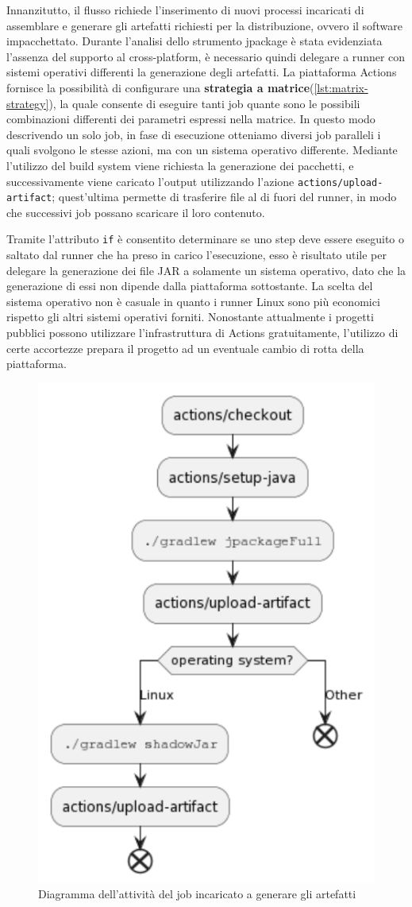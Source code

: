 Innanzitutto, il flusso richiede l'inserimento di nuovi processi incaricati di assemblare e generare gli artefatti richiesti per la distribuzione, ovvero il software impacchettato. Durante l'analisi dello strumento jpackage è stata evidenziata l'assenza del supporto al cross-platform, è necessario quindi delegare a runner con sistemi operativi differenti la generazione degli artefatti. La piattaforma Actions fornisce la possibilità di configurare una \textbf{strategia a matrice}(\cref{lst:matrix-strategy}), la quale consente di eseguire tanti job quante sono le possibili combinazioni differenti dei parametri espressi nella matrice. In questo modo descrivendo un solo job, in fase di esecuzione otteniamo diversi job paralleli i quali svolgono le stesse azioni, ma con un sistema operativo differente. Mediante l'utilizzo del build system viene richiesta la generazione dei pacchetti, e successivamente viene caricato l'output utilizzando l'azione \texttt{actions/upload-artifact}; quest'ultima permette di trasferire file al di fuori del runner, in modo che successivi job possano scaricare il loro contenuto. 



Tramite l'attributo \texttt{if} è consentito determinare se uno step deve essere eseguito o saltato dal runner che ha preso in carico l'esecuzione, esso è risultato utile per delegare la generazione dei file JAR a solamente un sistema operativo, dato che la generazione di essi non dipende dalla piattaforma sottostante. La scelta del sistema operativo non è casuale in quanto i runner Linux sono più economici rispetto gli altri sistemi operativi forniti. Nonostante attualmente i progetti pubblici possono utilizzare l'infrastruttura di Actions gratuitamente, l'utilizzo di certe accortezze prepara il progetto ad un eventuale cambio di rotta della piattaforma.

\begin{figure}[htb]
	\centering
	\includegraphics[width=.5\linewidth]{figures/generate-packages-job.pdf}
	\caption{Diagramma dell'attività del job incaricato a generare gli artefatti}
	\label{fig:generate-packages-job}
\end{figure}

